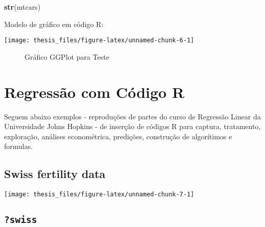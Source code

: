 \documentclass[12pt,openright,oneside,a4paper,chapter=TITLE,section=TITLE,subsection=Title,english,french,spanish,portugues,sumario=tradicional]{04-class-files/abntex2}
\newenvironment{Shaded}{\begin{snugshade}}{\end{snugshade}}
\newcommand{\DataTypeTok}[1]{\textcolor[rgb]{0.13,0.29,0.53}{#1}}
\newcommand{\DecValTok}[1]{\textcolor[rgb]{0.00,0.00,0.81}{#1}}
\newcommand{\KeywordTok}[1]{\textcolor[rgb]{0.13,0.29,0.53}{\textbf{#1}}}
\newcommand{\NormalTok}[1]{#1}
\newcommand{\OperatorTok}[1]{\textcolor[rgb]{0.81,0.36,0.00}{\textbf{#1}}}
\newcommand{\StringTok}[1]{\textcolor[rgb]{0.31,0.60,0.02}{#1}}
\begin{document}
\begin{Shaded}
\begin{Highlighting}[]
\KeywordTok{str}\NormalTok{(mtcars)}
\end{Highlighting}
\end{Shaded}

Modelo de gráfico em código R:

\begin{center}\texttt{[image: thesis\_files/figure-latex/unnamed-chunk-6-1]} \end{center}
\begin{figure}[!htb]
\centering
\caption{Gráfico GGPlot para Teste}
\label{fig:ggplot}
\end{figure}

\section{Regressão com Código R}

Seguem abaixo exemplos - reproduções de partes do curso de Regressão Linear da Universidade Johns Hopkins - de inserção de códigos R para captura, tratamento, exploração, análises econométrica, predições, construção de algorítimos e formulas.

\hypertarget{swiss-fertility-data}{%
\subsection{Swiss fertility data}\label{swiss-fertility-data}}

\begin{Shaded}
\end{Shaded}

\begin{center}\texttt{[image: thesis\_files/figure-latex/unnamed-chunk-7-1]} \end{center}

\hypertarget{swiss}{%
\subsection{\texorpdfstring{\texttt{?swiss}}{?swiss}}\label{swiss}}
\end{document}

